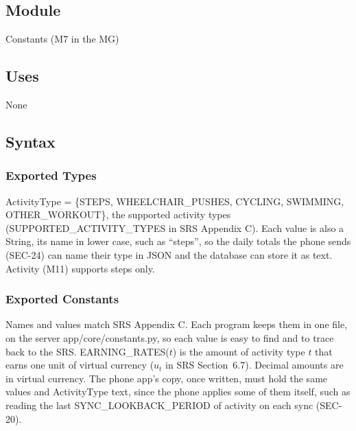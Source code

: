 \documentclass[12pt, titlepage]{article}
\begin{document}
\subsection{Module}

Constants (M7 in the MG)

\subsection{Uses}

None

\subsection{Syntax}

\subsubsection{Exported Types}

{\raggedright
ActivityType = \{STEPS, WHEELCHAIR\_PUSHES, CYCLING, SWIMMING, OTHER\_WORKOUT\},
the supported activity types (SUPPORTED\_ACTIVITY\_TYPES in SRS Appendix C).
Each value is also a String, its name in lower case, such as ``steps'', so the
daily totals the phone sends (SEC-24) can name their type in JSON and the
database can store it as text. Activity (M11) supports steps only.\par}

\subsubsection{Exported Constants}

Names and values match SRS Appendix C. Each program keeps them in one file,
on the server app/core/\allowbreak constants.py, so each value is easy to find and to
trace back to the SRS. EARNING\_RATES($t$) is the amount of activity type $t$
that earns one unit of virtual currency ($u_t$ in SRS Section~6.7). Decimal
amounts are in virtual currency. The phone app's copy, once written, must hold
the same values and ActivityType text, since the phone applies some of them
itself, such as reading the last SYNC\_LOOKBACK\_PERIOD of activity on each
sync (SEC-20).
\end{document}

